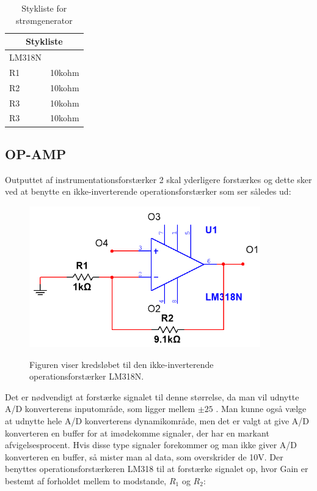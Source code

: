 \begin{table}[H]
\centering
\caption{Stykliste for strømgenerator}
\label{Styklistestromgenerator}
\begin{tabular}{|l|l|}
\hline
\multicolumn{2}{|c|}{\textbf{Stykliste}} \\ \hline
LM318N             &                    \\ \hline
R1             &         10kohm  			\\ \hline
R2             &           10kohm         \\ \hline
R3             &         10kohm  			\\ \hline
R3             &         10kohm  			\\ \hline

\end{tabular}
\end{table}


\subsection{OP-AMP}
Outputtet af instrumentationsforstærker 2 skal yderligere forstærkes og dette sker ved at benytte en ikke-inverterende operationsforstærker som ser således ud: 

\begin{figure}[H]
\centering
{\includegraphics[width=10cm]
{Figure/IkkeInviterendeOpAmp}}
\caption{Figuren viser kredsløbet til den ikke-inverterende operationsforstærker LM318N.}
\label{Fig:IkkeInviterendeOpAmp}
\end{figure} 




Det er nødvendigt at forstærke signalet til denne størrelse, da man vil udnytte A/D konverterens inputområde, som ligger mellem $\pm 25$ \citep{NI}. Man kunne også vælge at udnytte hele A/D konverterens dynamikområde, men det er valgt at give A/D konverteren en buffer for at imødekomme signaler, der har en markant afvigelsesprocent. Hvis disse type signaler forekommer og man ikke giver A/D konverteren en buffer, så mister man al data, som overskrider de 10V.   
Der benyttes operationsforstærkeren LM318 til at forstærke signalet op, hvor Gain er bestemt af forholdet mellem to modstande, $R_1$  og $R_2$: 

